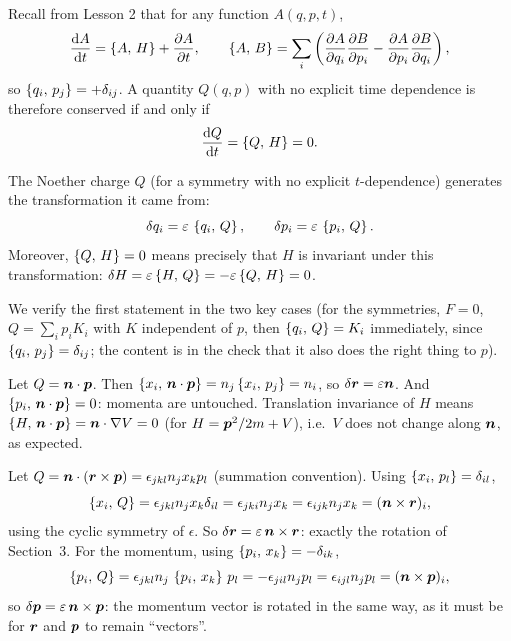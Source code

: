 \documentclass[11pt]{article}
\newcommand{\eps}{\varepsilon}
\begin{document}
Recall from Lesson 2 that for any function $A(q,p,t)$,
\begin{equation}
  \frac{\mathrm{d} A}{\mathrm{d} t}=\left\{A,\,H\right\}+\frac{\partial A}{\partial t},\qquad \left\{A,\,B\right\}=\sum_i\left(\frac{\partial A}{\partial q_i}\frac{\partial B}{\partial p_i}-\frac{\partial A}{\partial p_i}\frac{\partial B}{\partial q_i}\right),
\end{equation}
so $\left\{q_i,\,p_j\right\}=+\delta_{ij}$. A quantity $Q(q,p)$ with no explicit time dependence is therefore conserved if and only if
\begin{equation}
  \frac{\mathrm{d} Q}{\mathrm{d} t}=\left\{Q,\,H\right\}=0 .
\end{equation}

\begin{keyresult}
The Noether charge $Q$ (for a symmetry with no explicit $t$-dependence) generates the transformation it came from:
\begin{equation}
  \delta q_i=\eps\,\pb{q_i}{Q},\qquad \delta p_i=\eps\,\pb{p_i}{Q}.
\end{equation}
Moreover, $\left\{Q,\,H\right\}=0$ means precisely that $H$ is invariant under this transformation: $\delta H=\eps\pb{H}{Q}=-\eps\pb{Q}{H}=0$.
\end{keyresult}

We verify the first statement in the two key cases (for the symmetries, $F=0$, $Q=\sum_ip_iK_i$ with $K$ independent of $p$, then $\left\{q_i,\,Q\right\}=K_i$ immediately, since $\left\{q_i,\,p_j\right\}=\delta_{ij}$; the content is in the check that it also does the right thing to $p$).

\begin{example}
Let $Q=\bm{n}\cdot\bm{p}$. Then $\left\{x_i,\,\bm{n}\cdot\bm{p}\right\}=n_j\left\{x_i,\,p_j\right\}=n_i$, so $\delta\vect r=\eps\vect n$. And $\left\{p_i,\,\bm{n}\cdot\bm{p}\right\}=0$: momenta are untouched. Translation invariance of $H$ means $\left\{H,\,\bm{n}\cdot\bm{p}\right\}=\bm{n}\cdot\nabla V=0$ (for $H=\bm{p}^2/2m+V$), i.e.\ $V$ does not change along $\bm{n}$, as expected.
\end{example}

\begin{example}
Let $Q=\bm{n}\cdot(\bm{r}\times\bm{p})=\epsilon_{jkl}n_jx_kp_l$ (summation convention). Using $\left\{x_i,\,p_l\right\}=\delta_{il}$,
\begin{equation}
  \left\{x_i,\,Q\right\}=\epsilon_{jkl}n_jx_k\delta_{il}=\epsilon_{jki}n_jx_k=\epsilon_{ijk}n_jx_k=(\bm{n}\times\bm{r})_i,
\end{equation}
using the cyclic symmetry of $\epsilon$. So $\delta\vect r=\eps\,\vect n\times\vect r$: exactly the rotation of Section~3. For the momentum, using $\left\{p_i,\,x_k\right\}=-\delta_{ik}$,
\begin{equation}
  \left\{p_i,\,Q\right\}=\epsilon_{jkl}n_j\,\left\{p_i,\,x_k\right\}\,p_l=-\epsilon_{jil}n_jp_l=\epsilon_{ijl}n_jp_l=(\bm{n}\times\bm{p})_i,
\end{equation}
so $\delta\vect p=\eps\,\vect n\times\vect p$: the momentum vector is rotated in the same way, as it must be for $\bm{r}$ and $\bm{p}$ to remain ``vectors''.
\end{example}
\end{document}
